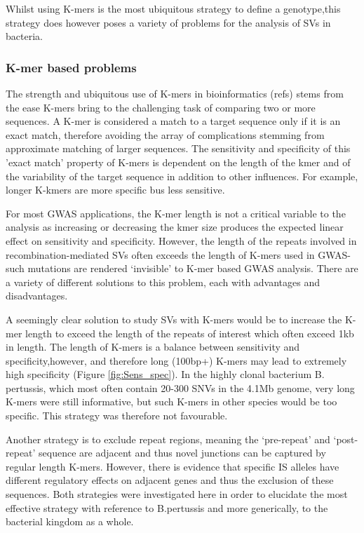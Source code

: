 \documentclass{article}
\begin{document}
Whilst using K-mers is the most ubiquitous strategy to define a genotype,this strategy does however poses a variety of problems for the analysis of SVs in bacteria. 

\subsubsection{K-mer based problems}

The strength and ubiquitous use of K-mers in bioinformatics (refs) stems from the ease K-mers bring to the challenging task of comparing two or more sequences. A K-mer is considered a match to a target sequence only if it is an exact match, therefore avoiding the array of complications stemming from approximate matching of larger sequences. The sensitivity and specificity of this 'exact match' property of K-mers is dependent on the length of the kmer and of the variability of the target sequence in addition to other influences. For example, longer K-kmers are more specific bus less sensitive. 



For most GWAS applications, the K-mer length is not a critical variable to the analysis as increasing or decreasing the kmer size produces the expected linear effect on sensitivity and specificity. However, the length of the repeats involved in recombination-mediated SVs often exceeds the length of K-mers used in GWAS- such mutations are rendered `invisible' to K-mer based GWAS analysis. There are a variety of different solutions to this problem, each with advantages and disadvantages.

A seemingly clear solution to study SVs with K-mers would be to increase the K-mer length to exceed the length of the repeats of interest which often exceed 1kb in length. The length of K-mers is a balance between sensitivity and specificity,however, and therefore  long (100bp+) K-mers may lead to extremely high specificity (Figure \ref{fig:Sens_spec}). In the highly clonal bacterium B. pertussis, which most often contain 20-300 SNVs in the 4.1Mb genome, very long K-mers were still informative, but such K-mers in other species would be too specific. This strategy was therefore not favourable.

Another strategy is to exclude repeat regions, meaning the `pre-repeat' and `post-repeat' sequence are adjacent and thus novel junctions can be captured by regular length K-mers. However, there is evidence that specific IS alleles have different regulatory effects on adjacent genes and thus the exclusion of these sequences. Both strategies were investigated here in order to elucidate the most effective strategy with reference to B.pertussis and more generically, to the bacterial kingdom as a whole.
\end{document}
